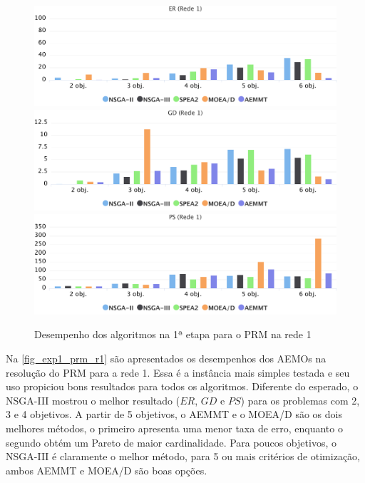 \begin{figure}[!htbp]
	\includegraphics[width=1\textwidth]{cap_experimentos/figs/etapa1/er-mrp-r1}
	\includegraphics[width=1\textwidth]{cap_experimentos/figs/etapa1/gd-mrp-r1}
	\includegraphics[width=1\textwidth]{cap_experimentos/figs/etapa1/ps-mrp-r1}
	\caption{\label{fig_exp1_prm_r1}Desempenho dos algoritmos na 1ª etapa para o PRM na rede 1}
\end{figure}

Na \autoref{fig_exp1_prm_r1} são apresentados os desempenhos dos AEMOs na resolução do PRM para a rede 1. Essa é a instância mais simples testada e seu uso propiciou bons resultados para todos os algoritmos. Diferente do esperado, o NSGA-III mostrou o melhor resultado ($ER$, $GD$ e $PS$) para os problemas com 2, 3 e 4 objetivos. A partir de 5 objetivos, o AEMMT e o MOEA/D são os dois melhores métodos, o primeiro apresenta uma menor taxa de erro, enquanto o segundo obtém um Pareto de maior cardinalidade. Para poucos objetivos, o NSGA-III é claramente o melhor método, para 5 ou mais critérios de otimização, ambos AEMMT e MOEA/D são boas opções.

